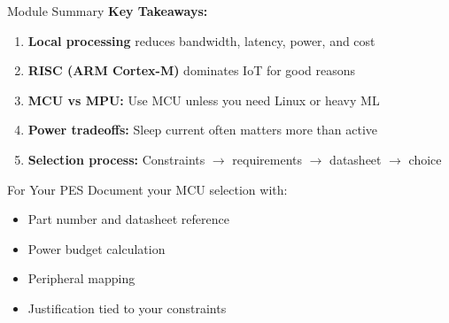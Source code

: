 \documentclass[aspectratio=169,11pt]{beamer}
\begin{document}
\begin{frame}{Module Summary}
    \textbf{Key Takeaways:}
    
    \vspace{0.3cm}
    \begin{enumerate}
        \item \textbf{Local processing} reduces bandwidth, latency, power, and cost
        \item \textbf{RISC (ARM Cortex-M)} dominates IoT for good reasons
        \item \textbf{MCU vs MPU:} Use MCU unless you need Linux or heavy ML
        \item \textbf{Power tradeoffs:} Sleep current often matters more than active
        \item \textbf{Selection process:} Constraints $\rightarrow$ requirements $\rightarrow$ datasheet $\rightarrow$ choice
    \end{enumerate}
    
    \vspace{0.3cm}
    \begin{block}{For Your PES}
        Document your MCU selection with:
        \begin{itemize}
            \item Part number and datasheet reference
            \item Power budget calculation
            \item Peripheral mapping
            \item Justification tied to your constraints
        \end{itemize}
    \end{block}
\end{frame}
\end{document}
